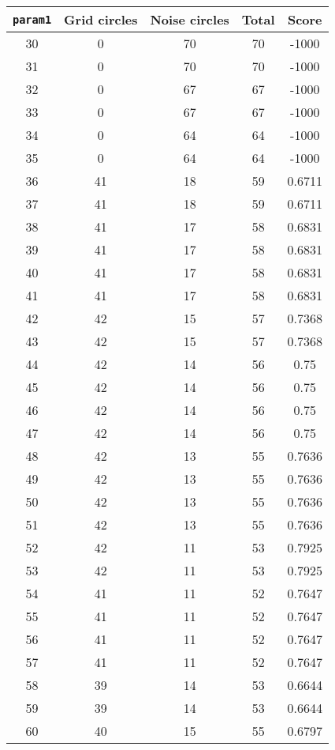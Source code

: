 \documentclass[letterpaper, 12pt]{article}
\begin{document}
\begin{longtable}{|c|c|c|c|c|}
\hline
\textbf{\texttt{param1}} & \textbf{Grid circles} & \textbf{Noise circles} & \textbf{Total} & \textbf{Score} \\
\hline
30 & 0 & 70 & 70 & -1000 \\
\hline
31 & 0 & 70 & 70 & -1000 \\
\hline
32 & 0 & 67 & 67 & -1000 \\
\hline
33 & 0 & 67 & 67 & -1000 \\
\hline
34 & 0 & 64 & 64 & -1000 \\
\hline
35 & 0 & 64 & 64 & -1000 \\
\hline
36 & 41 & 18 & 59 & 0.6711 \\
\hline
37 & 41 & 18 & 59 & 0.6711 \\
\hline
38 & 41 & 17 & 58 & 0.6831 \\
\hline
39 & 41 & 17 & 58 & 0.6831 \\
\hline
40 & 41 & 17 & 58 & 0.6831 \\
\hline
41 & 41 & 17 & 58 & 0.6831 \\
\hline
42 & 42 & 15 & 57 & 0.7368 \\
\hline
43 & 42 & 15 & 57 & 0.7368 \\
\hline
44 & 42 & 14 & 56 & 0.75 \\
\hline
45 & 42 & 14 & 56 & 0.75 \\
\hline
46 & 42 & 14 & 56 & 0.75 \\
\hline
47 & 42 & 14 & 56 & 0.75 \\
\hline
48 & 42 & 13 & 55 & 0.7636 \\
\hline
49 & 42 & 13 & 55 & 0.7636 \\
\hline
50 & 42 & 13 & 55 & 0.7636 \\
\hline
51 & 42 & 13 & 55 & 0.7636 \\
\hline
52 & 42 & 11 & 53 & 0.7925 \\
\hline
53 & 42 & 11 & 53 & 0.7925 \\
\hline
54 & 41 & 11 & 52 & 0.7647 \\
\hline
55 & 41 & 11 & 52 & 0.7647 \\
\hline
56 & 41 & 11 & 52 & 0.7647 \\
\hline
57 & 41 & 11 & 52 & 0.7647 \\
\hline
58 & 39 & 14 & 53 & 0.6644 \\
\hline
59 & 39 & 14 & 53 & 0.6644 \\
\hline
60 & 40 & 15 & 55 & 0.6797 \\
\hline

\end{longtable}
\end{document}
